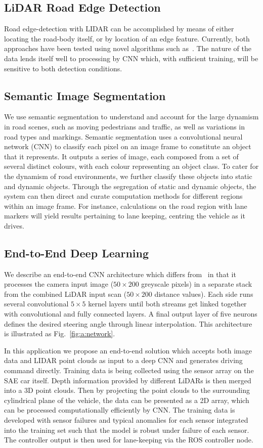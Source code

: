 \subsection{LiDAR Road Edge Detection}
Road edge-detection with LIDAR can be accomplished by means of either locating the road-body itself, or by location of an edge feature. Currently, both approaches have been tested using novel algorithms such as~\cite{t._drage_integration_2014}. The nature of the data lends itself well to processing by CNN which, with sufficient training, will be sensitive to both detection conditions.

\subsection{Semantic Image Segmentation}
We use semantic segmentation to understand and account for the large dynamism in road scenes, such as moving pedestrians and traffic, as well as variations in road types and markings. Semantic segmentation uses a convolutional neural network (CNN) to classify each pixel on an image frame to constitute an object that it represents. It outputs a series of image, each composed from a set of several distinct colours, with each colour representing an object class. To cater for the dynamism of road environments, we further classify these objects into static and dynamic objects. Through the segregation of static and dynamic objects, the system can then direct and curate computation methods for different regions within an image frame. For instance, calculations on the road region with lane markers will yield results pertaining to lane keeping, centring the vehicle as it drives. 

\subsection{End-to-End Deep Learning}
We describe an end-to-end CNN architecture which differs from~\cite{bojarski_end_2016} in that it processes the camera input image ($50\times200$ greyscale pixels) in a separate stack from the combined LiDAR input scan ($50\times200$ distance values). Each side runs several convolutional $5\times5$ kernel layers until both streams get linked together with convolutional and fully connected layers. A final output layer of five neurons defines the desired steering angle through linear interpolation. This architecture is illustrated as Fig.~\ref{fig:a:network}.

In this application we propose an end-to-end solution which accepts both image data and LIDAR point clouds as input to a deep CNN and generates driving command directly. Training data is being collected using the sensor array on the SAE car itself. Depth information provided by different LiDARs is then merged into a 3D point clouds. Then by projecting the point clouds to the surrounding cylindrical plane of the vehicle, the data can be presented as a 2D array, which can be processed computationally efficiently by CNN. The training data is developed with sensor failures and typical anomalies for each sensor integrated into the training set such that the model is robust under failure of each sensor. The controller output is then used for lane-keeping via the ROS controller node.

